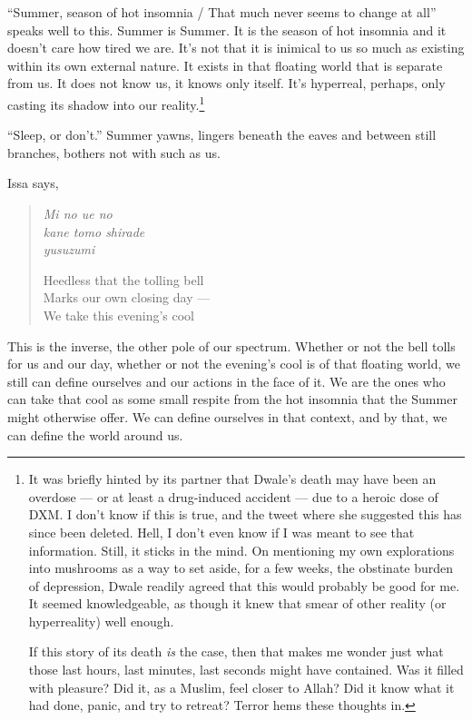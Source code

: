\documentclass[12pt,oneside]{memoir}
\begin{document}
``Summer, season of hot insomnia / That much never seems to change at all'' speaks well to this. Summer is Summer. It is the season of hot insomnia and it doesn't care how tired we are. It's not that it is inimical to us so much as existing within its own external nature. It exists in that floating world that is separate from us. It does not know us, it knows only itself. It's hyperreal, perhaps, only casting its shadow into our reality.\footnote{It was briefly hinted by its partner that Dwale's death may have been an overdose --- or at least a drug-induced accident --- due to a heroic dose of DXM. I don't know if this is true, and the tweet where she suggested this has since been deleted. Hell, I don't even know if I was meant to see that information. Still, it sticks in the mind. On mentioning my own explorations into mushrooms as a way to set aside, for a few weeks, the obstinate burden of depression, Dwale readily agreed that this would probably be good for me. It seemed knowledgeable, as though it knew that smear of other reality (or hyperreality) well enough.\par If this story of its death \emph{is} the case, then that makes me wonder just what those last hours, last minutes, last seconds might have contained. Was it filled with pleasure? Did it, as a Muslim, feel closer to Allah? Did it know what it had done, panic, and try to retreat? Terror hems these thoughts in.} 

``Sleep, or don't.'' Summer yawns, lingers beneath the eaves and between still branches, bothers not with such as us.

Issa says,

\begin{verse}
\emph{Mi no ue no} \\
\emph{kane tomo shirade} \\
\emph{yusuzumi} 

Heedless that the tolling bell \\
Marks our own closing day --- \\
We take this evening's cool

\parencite[39]{issa}
\end{verse}

This is the inverse, the other pole of our spectrum. Whether or not the bell tolls for us and our day, whether or not the evening's cool is of that floating world, we still can define ourselves and our actions in the face of it. We are the ones who can take that cool as some small respite from the hot insomnia that the Summer might otherwise offer. We can define ourselves in that context, and by that, we can define the world around us.
\end{document}
